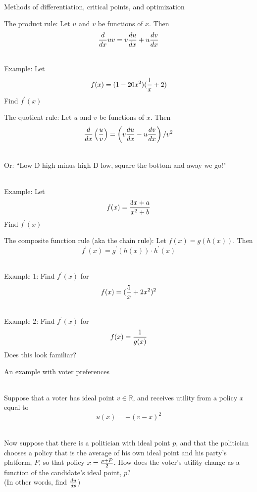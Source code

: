 \documentclass[10pt]{seminar}
\begin{document}
\newtheorem{proposition}{Proposition}

\newtheorem{definition}{Definition}

\newtheorem{corollary}{Corollary}

\newtheorem{theorem}{Theorem}

\newtheorem{lemma}{Lemma}

\def\argmax{\mathop{\rm argmax}\limits}  



\sffamily 


\begin{slide}
\begin{center}

Methods of differentiation, critical points, and optimization
 \end{center}
 
 \newslide
The product rule:  Let $u$ and $v$ be functions of $x$.  Then $${d\over{dx}}uv=v{{du}\over{dx}}+u{{dv}\over{dx}}$$

\ \\Example: Let $$f(x)= (1-20x^2)({1\over x}+2)$$ Find $f^\prime(x)$

\newslide
The quotient rule:  Let $u$ and $v$ be functions of $x$.  Then $${d\over{dx}}\left({u\over v}\right)={\left({v{{du}\over{dx}}-u{{dv}\over{dx}}}\right) / {v^2}}$$

\ \\Or: ``Low D high minus high D low, square the bottom and away we go!"

\ \\Example: Let $$f(x)= {{3x+a}\over{x^2+b}}$$ Find $f^\prime(x)$


\newslide
The composite function rule (aka the chain rule): Let $f(x)=g(h(x))$. Then $$f^\prime(x)=g^\prime(h(x))\cdot h^\prime(x)$$


\ \\Example 1: Find $f^\prime(x)$ for $$f(x)=({5\over x}+2x^2)^2$$ 

\ \\Example 2: Find $f^\prime(x)$ for   $$f(x)={1\over{g(x)}}$$ Does this look familiar?

\newslide

An example with voter preferences

\ \\Suppose that a voter has ideal point $v\in \mathbb{R}$, and receives utility from a policy $x$ equal to $$u(x)=-(v-x)^2$$

\ \\Now suppose that there is a politician with ideal point $p$, and that the politician chooses a policy that is the average of his own ideal point and his party's platform, $P$, so that policy $x={{p+P}\over 2}$.  How does the voter's utility change as a function of the candidate's ideal point, $p$? \\(In other words, find ${du}\over {dp}$)


\end{slide}
\end{document}
